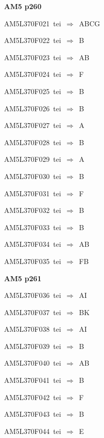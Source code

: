 \par\vfill\eject
{\bf\hfill AM5 p260\hfill\hbox{}}\par\bigskip
{\sixrm AM5L370F021\ {\sixit tei}\ }$\Rightarrow$\ ABCG\par\smallskip
{\sixrm AM5L370F022\ {\sixit tei}\ }$\Rightarrow$\ B\par\smallskip
{\sixrm AM5L370F023\ {\sixit tei}\ }$\Rightarrow$\ AB\par\smallskip
{\sixrm AM5L370F024\ {\sixit tei}\ }$\Rightarrow$\ F\par\smallskip
{\sixrm AM5L370F025\ {\sixit tei}\ }$\Rightarrow$\ B\par\smallskip
{\sixrm AM5L370F026\ {\sixit tei}\ }$\Rightarrow$\ B\par\smallskip
{\sixrm AM5L370F027\ {\sixit tei}\ }$\Rightarrow$\ A\par\smallskip
{\sixrm AM5L370F028\ {\sixit tei}\ }$\Rightarrow$\ B\par\smallskip
{\sixrm AM5L370F029\ {\sixit tei}\ }$\Rightarrow$\ A\par\smallskip
{\sixrm AM5L370F030\ {\sixit tei}\ }$\Rightarrow$\ B\par\smallskip
{\sixrm AM5L370F031\ {\sixit tei}\ }$\Rightarrow$\ F\par\smallskip
{\sixrm AM5L370F032\ {\sixit tei}\ }$\Rightarrow$\ B\par\smallskip
{\sixrm AM5L370F033\ {\sixit tei}\ }$\Rightarrow$\ B\par\smallskip
{\sixrm AM5L370F034\ {\sixit tei}\ }$\Rightarrow$\ AB\par\smallskip
{\sixrm AM5L370F035\ {\sixit tei}\ }$\Rightarrow$\ FB\par\smallskip

\par\vfill\eject
{\bf\hfill AM5 p261\hfill\hbox{}}\par\bigskip
{\sixrm AM5L370F036\ {\sixit tei}\ }$\Rightarrow$\ AI\par\smallskip
{\sixrm AM5L370F037\ {\sixit tei}\ }$\Rightarrow$\ BK\par\smallskip
{\sixrm AM5L370F038\ {\sixit tei}\ }$\Rightarrow$\ AI\par\smallskip
{\sixrm AM5L370F039\ {\sixit tei}\ }$\Rightarrow$\ B\par\smallskip
{\sixrm AM5L370F040\ {\sixit tei}\ }$\Rightarrow$\ AB\par\smallskip
{\sixrm AM5L370F041\ {\sixit tei}\ }$\Rightarrow$\ B\par\smallskip
{\sixrm AM5L370F042\ {\sixit tei}\ }$\Rightarrow$\ F\par\smallskip
{\sixrm AM5L370F043\ {\sixit tei}\ }$\Rightarrow$\ B\par\smallskip
{\sixrm AM5L370F044\ {\sixit tei}\ }$\Rightarrow$\ E\par\smallskip

